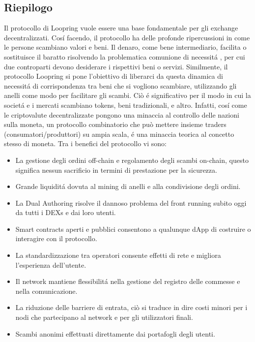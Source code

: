 \documentclass[UTF8,nofonts]{article}
\begin{document}
\begin{multicols}{2}
\section{Riepilogo}
Il protocollo di Loopring vuole essere una base fondamentale per gli exchange decentralizzati. Cos\'i facendo, il protocollo ha delle profonde ripercussioni in come le persone scambiano valori e beni. Il denaro, come bene intermediario, facilita o sostituisce il baratto risolvendo la problematica comunione di necessit\'a \cite{unenumerated2006}, per cui due controparti devono desiderare i rispettivi  beni o servizi. Similmente, il protocollo Loopring si pone l'obiettivo di liberarci da questa dinamica di necessit\'a di corrispondenza tra beni che si vogliono scambiare, utilizzando gli anelli come modo per facilitare gli scambi. Ciò \'e significativo per il modo in cui la societ\'a e i mercati scambiano tokens, beni tradizionali, e altro. Infatti, cos\'i come le criptovalute decentralizzate pongono una minaccia al controllo delle nazioni sulla moneta, un protocollo combinatorio che può mettere insieme traders (consumatori/produttori) su ampia scala, \'e una minaccia teorica al concetto stesso di moneta.
Tra i benefici del protocollo vi sono:
\begin{itemize}
	\item La gestione degli ordini off-chain e regolamento degli scambi on-chain, questo significa nessun sacrificio in termini di prestazione per la sicurezza.
	\item Grande liquidit\'a dovuta al mining di anelli e alla condivisione degli ordini.
	\item La Dual Authoring risolve il dannoso problema del front running subito oggi da tutti i DEXs e dai loro utenti.
	\item Smart contracts aperti e pubblici consentono a qualunque dApp di costruire o interagire con il protocollo.
	\item La standardizzazione tra operatori consente effetti di rete e migliora l'esperienza dell'utente.
	\item Il network mantiene flessibilit\'a nella gestione del registro delle commesse e nella comunicazione.
	\item La riduzione delle barriere di entrata, ciò si traduce in dire costi minori per i nodi che partecipano al network e per gli utilizzatori finali.
	\item Scambi anonimi effettuati direttamente dai portafogli degli utenti.
\end{itemize}

\end{multicols}
\end{document}
